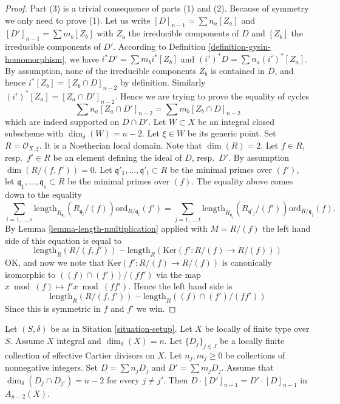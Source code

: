 \begin{proof}
Part (3) is a trivial consequence of parts (1) and (2).
Because of symmetry we only need to prove (1).
Let us write $[D]_{n - 1} = \sum n_a[Z_a]$ and
$[D']_{n - 1} = \sum m_b[Z_b]$ with $Z_a$ the irreducible
components of $D$ and $[Z_b]$ the irreducible
components of $D'$.
According to Definition \ref{definition-gysin-homomorphism},
we have $i^*D' = \sum m_b i^*[Z_b]$ and $(i')^*D = \sum n_a(i')^*[Z_a]$.
By assumption, none of the irreducible components $Z_b$
is contained in $D$, and hence $i^*[Z_b] = [Z_b\cap D]_{n - 2}$
by definition. Similarly $(i')^*[Z_a] = [Z_a \cap D']_{n - 2}$.
Hence we are trying to prove the equality of cycles
$$
\sum n_a[Z_a \cap D']_{n - 2} = \sum m_b[Z_b \cap D]_{n - 2}
$$
which are indeed supported on $D \cap D'$.
Let $W \subset X$ be an integral closed subscheme
with $\dim_\delta(W) = n - 2$. Let $\xi \in W$ be its generic point.
Set $R = \mathcal{O}_{X, \xi}$. It is a Noetherian local domain.
Note that $\dim(R) = 2$. Let $f \in R$, resp.\ $f' \in R$
be an element defining the ideal of $D$, resp.\ $D'$.
By assumption $\dim(R/(f, f')) = 0$. Let
$\mathfrak q'_1, \ldots, \mathfrak q'_t \subset R$ be the minimal
primes over $(f')$, let $\mathfrak q_1, \ldots, \mathfrak q_s \subset R$
be the minimal primes over $(f)$.
The equality above comes down to the equality
$$
\sum_{i = 1, \ldots, s}
\text{length}_{R_{\mathfrak q_i}}(R_{\mathfrak q_i}/(f))
\text{ord}_{R/\mathfrak q_i}(f')
=
\sum_{j = 1, \ldots, t}
\text{length}_{R_{\mathfrak q_j}}(R_{\mathfrak q'_j}/(f'))
\text{ord}_{R/\mathfrak q_j}(f).
$$
By Lemma \ref{lemma-length-multiplication}
applied with $M = R/(f)$ the left hand side of
this equation is equal to
$$
\text{length}_R(R/(f, f'))
-
\text{length}_R(\text{Ker}(f' : R/(f) \to R/(f)))
$$
OK, and now we note that
$\text{Ker}(f' : R/(f) \to R/(f))$ is canonically isomorphic
to $((f) \cap (f'))/(ff')$ via the map $x \bmod (f) \mapsto
f'x \bmod (ff')$. Hence the left hand side is
$$
\text{length}_R(R/(f, f'))
-
\text{length}_R((f) \cap (f')/(ff'))
$$
Since this is symmetric in $f$ and $f'$ we win.
\end{proof}

\begin{lemma}
\label{lemma-commutativity-effective-Cartier-proper-intersection-inifinite}
Let $(S, \delta)$ be as in Sitation \ref{situation-setup}.
Let $X$ be locally of finite type over $S$.
Assume $X$ integral and $\dim_\delta(X) = n$.
Let $\{D_j\}_{j \in J}$ be a locally finite collection of
effective Cartier divisors on $X$. Let $n_j, m_j \geq 0$ be
collections of nonnegative integers. Set
$D = \sum n_j D_j$ and $D' = \sum m_j D_j$.
Assume that $\dim_\delta(D_j \cap D_{j'}) = n - 2$ for every
$j \not = j'$. Then $D \cdot [D']_{n - 1} = D' \cdot [D]_{n - 1}$ in
$A_{n - 2}(X)$.
\end{lemma}

